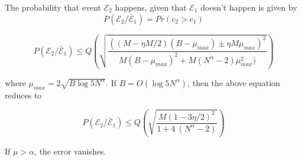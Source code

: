 The probability that event $\mathcal{E}_2$ happens, given that $\mathcal{E}_1$ doesn't happen is given by
\[ P(\mathcal{E}_2 / \bar{\mathcal{E}}_1 ) = Pr(c_2 > c_1) \]



\[ P(\mathcal{E}_2 / \bar{\mathcal{E}}_1 ) \leq Q \left( \sqrt{\frac{((M-\eta M/2)(B-\mu_{max}) \pm \eta M \mu_{max})^2}{M(B-\mu_{max})^2 + M(N^{\alpha}-2)\mu_{max}^2)}} \right) \]

where $\mu_{max} = 2\sqrt{B \log 5 N^{\alpha}} $. If $B = O(\log 5 N^{\alpha})$, then the above equation reduces to

\[ P(\mathcal{E}_2 / \bar{\mathcal{E}}_1 ) \leq Q \left( \sqrt{\frac{M(1-3\eta/2)^2}{1 + 4~ (N^{\alpha}-2)}} \right) \]

If $\mu > \alpha$, the error vanishes.
